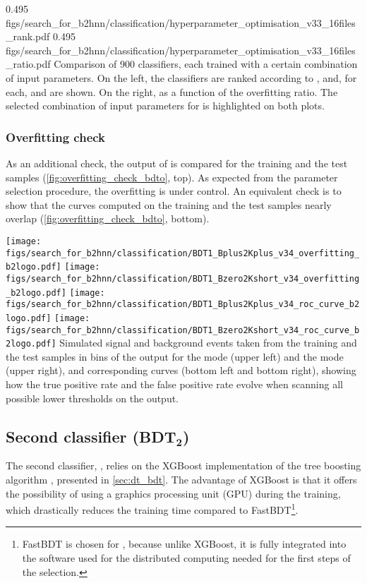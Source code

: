 {0.495}
{figs/search_for_b2hnn/classification/hyperparameter_optimisation_v33_16files_rank.pdf}
{0.495}
{figs/search_for_b2hnn/classification/hyperparameter_optimisation_v33_16files_ratio.pdf}
{
Comparison of 900 classifiers, each trained with a certain combination of input parameters.
On the left, the classifiers are ranked according to \auctrain, and, for each, \auctrain and \auctest are shown.
On the right, \auctest as a function of the overfitting ratio.
The selected combination of input parameters for \bdto is highlighted on both plots.
}
\subsubsection*{Overfitting check}
As an additional check, the output of \bdto is compared for the training and the test samples (\cref{fig:overfitting_check_bdto}, top).
As expected from the parameter selection procedure, the overfitting is under control.
An equivalent check is to show that the \ROC curves computed on the training and the test samples nearly overlap (\cref{fig:overfitting_check_bdto}, bottom).

{
\texttt{[image: figs/search\_for\_b2hnn/classification/BDT1\_Bplus2Kplus\_v34\_overfitting\_b2logo.pdf]}
\texttt{[image: figs/search\_for\_b2hnn/classification/BDT1\_Bzero2Kshort\_v34\_overfitting\_b2logo.pdf]}
\texttt{[image: figs/search\_for\_b2hnn/classification/BDT1\_Bplus2Kplus\_v34\_roc\_curve\_b2logo.pdf]}
\texttt{[image: figs/search\_for\_b2hnn/classification/BDT1\_Bzero2Kshort\_v34\_roc\_curve\_b2logo.pdf]}
}
{
Simulated signal and background events taken from the training and the test samples in bins of the \bdto output for the \BKpnn mode (upper left) and the \BKznn mode (upper right), and corresponding \ROC curves (bottom left and bottom right), showing how the true positive rate and the false positive rate evolve when scanning all possible lower thresholds on the \bdto output.
}
\subsection[Second classifier (\bdtt)]{Second classifier (BDT$\mathbf{_2}$)} \label{sec:bdtt}
The second classifier, \bdtt, relies on the XGBoost implementation of the tree boosting algorithm \cite{Chen:2016:XST:2939672.2939785}, presented in \cref{sec:dt_bdt}. 
The advantage of XGBoost is that it offers the possibility of using a graphics processing unit (GPU) during the training, which drastically reduces the training time compared to FastBDT\footnote{FastBDT is chosen for \bdto, because unlike XGBoost, it is fully integrated into the software used for the distributed computing needed for the first steps of the selection.}.

